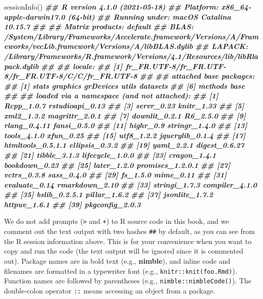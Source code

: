 \documentclass[
  12pt,
]{krantz}
\newenvironment{Shaded}{\begin{snugshade}}{\end{snugshade}}
\newcommand{\DocumentationTok}[1]{\textcolor[rgb]{0.56,0.35,0.01}{\textbf{\textit{#1}}}}
\newcommand{\FunctionTok}[1]{\textcolor[rgb]{0.00,0.00,0.00}{#1}}
\newcommand{\NormalTok}[1]{#1}
\begin{document}
\begin{Shaded}
\begin{Highlighting}[]
\FunctionTok{sessionInfo}\NormalTok{()}
\DocumentationTok{\#\# R version 4.1.0 (2021{-}05{-}18)}
\DocumentationTok{\#\# Platform: x86\_64{-}apple{-}darwin17.0 (64{-}bit)}
\DocumentationTok{\#\# Running under: macOS Catalina 10.15.7}
\DocumentationTok{\#\# }
\DocumentationTok{\#\# Matrix products: default}
\DocumentationTok{\#\# BLAS:   /System/Library/Frameworks/Accelerate.framework/Versions/A/Frameworks/vecLib.framework/Versions/A/libBLAS.dylib}
\DocumentationTok{\#\# LAPACK: /Library/Frameworks/R.framework/Versions/4.1/Resources/lib/libRlapack.dylib}
\DocumentationTok{\#\# }
\DocumentationTok{\#\# locale:}
\DocumentationTok{\#\# [1] fr\_FR.UTF{-}8/fr\_FR.UTF{-}8/fr\_FR.UTF{-}8/C/C/fr\_FR.UTF{-}8}
\DocumentationTok{\#\# }
\DocumentationTok{\#\# attached base packages:}
\DocumentationTok{\#\# [1] stats     graphics  grDevices utils     datasets }
\DocumentationTok{\#\# [6] methods   base     }
\DocumentationTok{\#\# }
\DocumentationTok{\#\# loaded via a namespace (and not attached):}
\DocumentationTok{\#\#  [1] Rcpp\_1.0.7        rstudioapi\_0.13  }
\DocumentationTok{\#\#  [3] servr\_0.23        knitr\_1.33       }
\DocumentationTok{\#\#  [5] xml2\_1.3.2        magrittr\_2.0.1   }
\DocumentationTok{\#\#  [7] downlit\_0.2.1     R6\_2.5.0         }
\DocumentationTok{\#\#  [9] rlang\_0.4.11      fansi\_0.5.0      }
\DocumentationTok{\#\# [11] highr\_0.9         stringr\_1.4.0    }
\DocumentationTok{\#\# [13] tools\_4.1.0       xfun\_0.25        }
\DocumentationTok{\#\# [15] utf8\_1.2.2        jquerylib\_0.1.4  }
\DocumentationTok{\#\# [17] htmltools\_0.5.1.1 ellipsis\_0.3.2   }
\DocumentationTok{\#\# [19] yaml\_2.2.1        digest\_0.6.27    }
\DocumentationTok{\#\# [21] tibble\_3.1.3      lifecycle\_1.0.0  }
\DocumentationTok{\#\# [23] crayon\_1.4.1      bookdown\_0.23    }
\DocumentationTok{\#\# [25] later\_1.2.0       promises\_1.2.0.1 }
\DocumentationTok{\#\# [27] vctrs\_0.3.8       sass\_0.4.0       }
\DocumentationTok{\#\# [29] fs\_1.5.0          mime\_0.11        }
\DocumentationTok{\#\# [31] evaluate\_0.14     rmarkdown\_2.10   }
\DocumentationTok{\#\# [33] stringi\_1.7.3     compiler\_4.1.0   }
\DocumentationTok{\#\# [35] bslib\_0.2.5.1     pillar\_1.6.2     }
\DocumentationTok{\#\# [37] jsonlite\_1.7.2    httpuv\_1.6.1     }
\DocumentationTok{\#\# [39] pkgconfig\_2.0.3}
\end{Highlighting}
\end{Shaded}

We do not add prompts (\texttt{\textgreater{}} and \texttt{+}) to R source code in this book, and we comment out the text output with two hashes \texttt{\#\#} by default, as you can see from the R session information above. This is for your convenience when you want to copy and run the code (the text output will be ignored since it is commented out). Package names are in bold text (e.g., \textbf{nimble}), and inline code and filenames are formatted in a typewriter font (e.g., \texttt{knitr::knit(\textquotesingle{}foo.Rmd\textquotesingle{})}). Function names are followed by parentheses (e.g., \texttt{nimble::nimbleCode()}). The double-colon operator \texttt{::} means accessing an object from a package.
\end{document}
